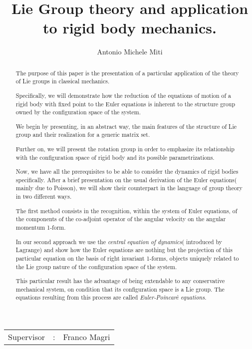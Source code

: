 \documentclass[11pt]{article}
\title{Lie Group theory and application to rigid body mechanics. }
\author{Antonio Michele Miti}
\date{}
\begin{document}
\maketitle

\begin{center}
\begin{tabular}{l c l}
Supervisor & : & Franco Magri \\
\end{tabular}

\end{center}



\begin{abstract}
The purpose of this paper is the presentation of a particular application of the theory of Lie groups in classical mechanics.

Specifically, we will demonstrate how the reduction of the equations of motion of a rigid body with fixed point to the Euler equations is inherent to the structure group owned by the configuration space of the system.

We begin by presenting, in an abstract way, the main features of the structure of Lie group and their realization for a generic matrix set.

Further on, we will present the rotation group in order to emphasize its relationship with the configuration space of rigid body and its possible parametrizations.

Now, we have all the prerequisites to be able to consider the dynamics of rigid bodies specifically. After a brief presentation on the usual derivation of the Euler equations( mainly due to Poisson), we will show their counterpart in the language of group theory in two different ways.

The first method consists in the recognition, within the system of Euler equations, of the components of the co-adjoint operator of the angular velocity on the angular momentum 1-form.

In our second approach we use the \emph{central equation of dynamics}( introduced by Lagrange) and show how the Euler equations are nothing but the projection of this particular equation on the basis of right invariant 1-forms, objects uniquely related to the Lie group nature of the configuration space of the system.

This particular result has the advantage of being extendable to any conservative mechanical system, on condition that its configuration space is a Lie group. The equations resulting from this process are called \emph{Euler-Poincarè equations}.
\end{abstract}
\end{document}
